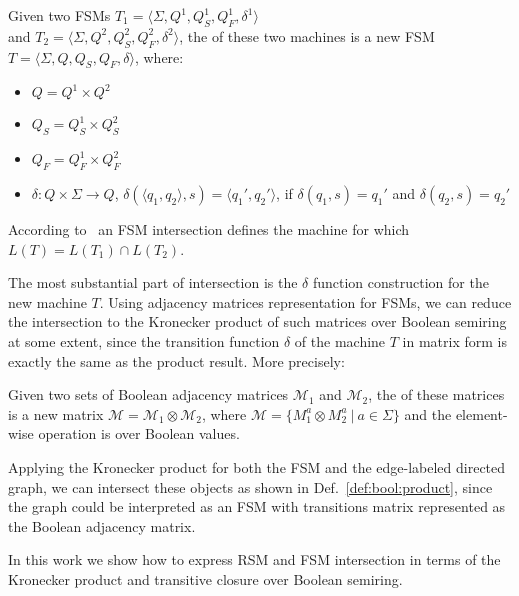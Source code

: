 \begin{definition}
\label{def:fsm:intersection}
Given two FSMs $T_1 = \langle \Sigma, Q^1, Q_S^1, Q_F^1, \delta^1 \rangle$ 
\\ and $T_2 = \langle \Sigma, Q^2, Q_S^2, Q_F^2, \delta^2 \rangle$, the  of these two machines is a new FSM $T = \langle \Sigma, Q, Q_S, Q_F, \delta \rangle$, where:
\begin{itemize}
    \item $Q = Q^1 \times Q^2$
    \item $Q_S = Q_S^1 \times Q_S^2$
    \item $Q_F = Q_F^1 \times Q_F^2$
    \item $\delta: Q \times \Sigma \to Q$, 
    $\delta (\langle q_1, q_2 \rangle, s) = \langle q_1', q_2' \rangle$, 
    \newline if $\delta(q_1,s)=q_1'$ and $\delta(q_2,s)=q_2'$
\end{itemize}
\end{definition}

According to~\cite{automata:theory:10.5555/1177300} an FSM intersection defines the machine for which $L(T) = L(T_1) \cap L(T_2)$.

The most substantial part of intersection is the $\delta$ function construction for the new machine $T$.
Using adjacency matrices representation for FSMs, we can reduce the intersection to the Kronecker product of such matrices over Boolean semiring at some extent, since the transition function $\delta$ of the machine $T$ in matrix form is exactly the same as the product result.
More precisely:

\begin{definition}
\label{def:bool:product}
Given two sets of Boolean adjacency matrices $\mathcal{M}_1$ and $\mathcal{M}_2$, the  of these matrices is a new matrix
$\mathcal{M} = \mathcal{M}_1 \otimes \mathcal{M}_2$, where $\mathcal{M} = \{ M_1^a \otimes M_2^a~|~a \in \Sigma \}$ and the element-wise operation is  over Boolean values.
\end{definition}

Applying the Kronecker product for both the FSM and the edge-labeled directed graph, we can intersect these objects as shown in Def.~\ref{def:bool:product}, since the graph could be interpreted as an FSM with transitions matrix represented as the Boolean adjacency matrix.

In this work we show how to express RSM and FSM intersection in terms of 
the Kronecker product and transitive closure over Boolean semiring.